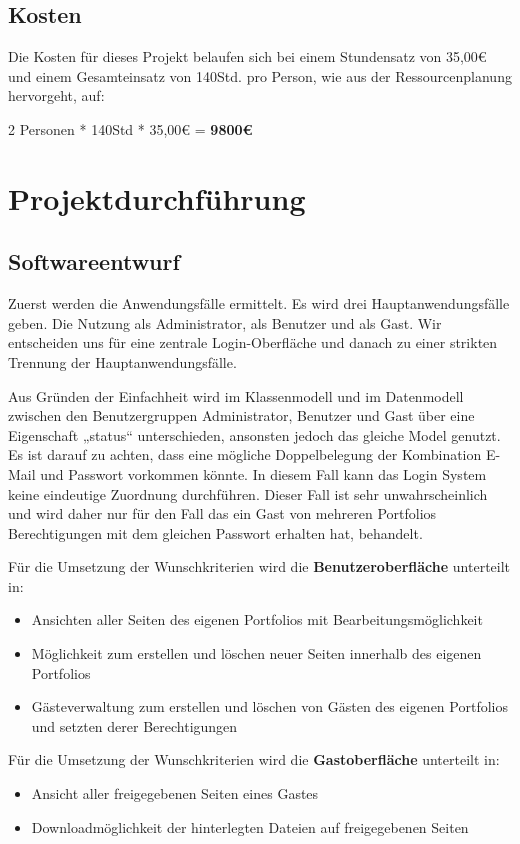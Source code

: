 \documentclass[10pt]{article}
\begin{document}
\subsection{Kosten}

Die Kosten für dieses Projekt belaufen sich bei einem Stundensatz von 35,00\euro{} und einem Gesamteinsatz von 140Std. pro Person, wie aus der Ressourcenplanung hervorgeht, auf:

2 Personen * 140Std * 35,00\euro{} 				= \textbf{9800\euro{}}

\section{Projektdurchführung}
\subsection{Softwareentwurf}

Zuerst werden die Anwendungsfälle ermittelt. Es wird drei Hauptanwendungsfälle geben. Die Nutzung als Administrator, als Benutzer und als Gast. Wir entscheiden uns für eine zentrale Login-Oberfläche und danach zu einer strikten Trennung der Hauptanwendungsfälle.

Aus Gründen der Einfachheit wird im Klassenmodell und im Datenmodell zwischen den Benutzergruppen Administrator, Benutzer und Gast über eine Eigenschaft „status“ unterschieden, ansonsten jedoch das gleiche Model genutzt. 
Es ist darauf zu achten, dass eine mögliche Doppelbelegung der Kombination E-Mail und Passwort vorkommen könnte. In diesem Fall kann das Login System keine eindeutige Zuordnung durchführen. 
Dieser Fall ist sehr unwahrscheinlich und wird daher nur für den Fall das ein Gast von mehreren Portfolios Berechtigungen mit dem gleichen Passwort erhalten hat, behandelt.

Für die Umsetzung der Wunschkriterien wird die \textbf{Benutzeroberfläche} unterteilt in:
\begin{itemize}
	\item Ansichten aller Seiten des eigenen Portfolios mit Bearbeitungsmöglichkeit
	\item  Möglichkeit zum erstellen und löschen neuer Seiten innerhalb des eigenen Portfolios
	\item  Gästeverwaltung zum erstellen und löschen von Gästen des eigenen Portfolios und setzten derer Berechtigungen    \end{itemize}
	
Für die Umsetzung der Wunschkriterien wird die \textbf{Gastoberfläche} unterteilt in:
\begin{itemize}
	\item Ansicht aller freigegebenen Seiten eines Gastes
	\item Downloadmöglichkeit der hinterlegten Dateien auf freigegebenen Seiten
\end{itemize}
\end{document}
